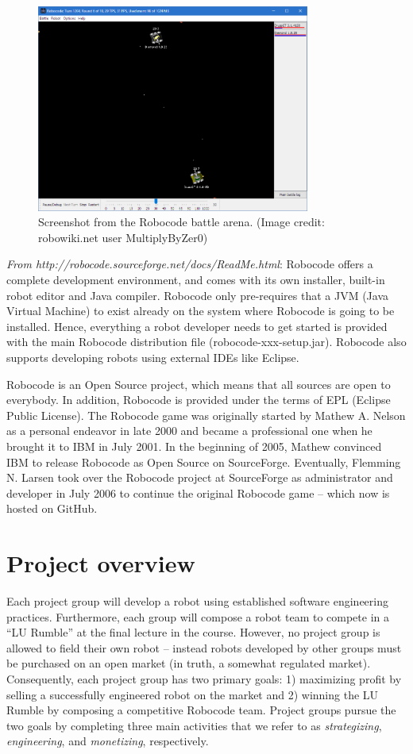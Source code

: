 \documentclass{scrreprt}
\begin{document}
\begin{figure}
\centering
\includegraphics[width=0.80\textwidth]{figures/screenshot.png}
\caption{Screenshot from the Robocode battle arena. (Image credit: robowiki.net user MultiplyByZer0)}
\label{fig:screenshot}
\end{figure}

\textit{From http://robocode.sourceforge.net/docs/ReadMe.html}:
Robocode offers a complete development environment, and comes with its own installer, built-in robot editor and Java compiler. Robocode only pre-requires that a JVM (Java Virtual Machine) to exist already on the system where Robocode is going to be installed. Hence, everything a robot developer needs to get started is provided with the main Robocode distribution file (robocode-xxx-setup.jar). Robocode also supports developing robots using external IDEs like Eclipse.

Robocode is an Open Source project, which means that all sources are open to everybody. In addition, Robocode is provided under the terms of EPL (Eclipse Public License). The Robocode game was originally started by Mathew A. Nelson as a personal endeavor in late 2000 and became a professional one when he brought it to IBM in July 2001. In the beginning of 2005, Mathew convinced IBM to release Robocode as Open Source on SourceForge. Eventually, Flemming N. Larsen took over the Robocode project at SourceForge as administrator and developer in July 2006 to continue the original Robocode game -- which now is hosted on GitHub.

\section{Project overview}
Each project group will develop a robot using established software engineering practices. Furthermore, each group will compose a robot team to compete in a ``LU Rumble'' at the final lecture in the course. However, no project group is allowed to field their own robot -- instead robots developed by other groups must be purchased on an open market (in truth, a somewhat regulated market). Consequently, each project group has two primary goals: 1) maximizing profit by selling a successfully engineered robot on the market and 2) winning the LU Rumble by composing a competitive Robocode team. Project groups pursue the two goals by completing three main activities that we refer to as \textit{strategizing}, \textit{engineering}, and \textit{monetizing}, respectively.
\end{document}
